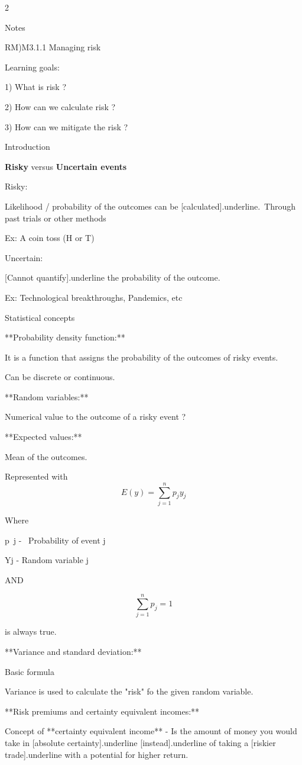 \documentclass{article}
\begin{document}
\begin{multicols}{2}


    
Notes

RM)M3.1.1 Managing risk

Learning goals:

1)  What is risk ?

2)  How can we calculate risk ?

3)  How can we mitigate the risk ?

Introduction

\textbf{Risky} versus \textbf{Uncertain events}

Risky:

Likelihood / probability of the outcomes can be [calculated]{.underline}.\
Through past trials or other methods

Ex: A coin toss (H or T)

Uncertain:

[Cannot quantify]{.underline} the probability of the outcome.

Ex: Technological breakthroughs, Pandemics, etc

Statistical concepts

**Probability density function:**

It is a function that assigns the probability of the outcomes of risky events.

Can be discrete or continuous.

**Random variables:**

Numerical value to the outcome of a risky event ?

**Expected values:**

Mean of the outcomes.

Represented with$$
E(y)=\sum_{j=1}^n p_j y_j 
$$

Where

\space p~j -~ Probability of event j

\space Yj - Random variable j

AND

$$
\sum_{j=1}^n p_j = 1$$

is always true.

**Variance and standard deviation:**

Basic formula


Variance is used to calculate the "risk" fo the given random variable.

**Risk premiums and certainty equivalent incomes:**

Concept of **certainty equivalent income** - Is the amount of money you would take in [absolute certainty]{.underline} [instead]{.underline} of taking a [riskier trade]{.underline} with a potential for higher return.


\end{multicols}
\end{document}

